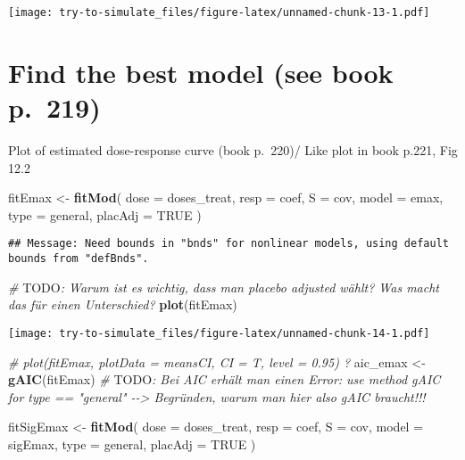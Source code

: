 \documentclass[
]{article}
\newenvironment{Shaded}{\begin{snugshade}}{\end{snugshade}}
\newcommand{\AlertTok}[1]{\textcolor[rgb]{0.94,0.16,0.16}{#1}}
\newcommand{\AttributeTok}[1]{\textcolor[rgb]{0.13,0.29,0.53}{#1}}
\newcommand{\CommentTok}[1]{\textcolor[rgb]{0.56,0.35,0.01}{\textit{#1}}}
\newcommand{\ConstantTok}[1]{\textcolor[rgb]{0.56,0.35,0.01}{#1}}
\newcommand{\FunctionTok}[1]{\textcolor[rgb]{0.13,0.29,0.53}{\textbf{#1}}}
\newcommand{\NormalTok}[1]{#1}
\newcommand{\OtherTok}[1]{\textcolor[rgb]{0.56,0.35,0.01}{#1}}
\newcommand{\StringTok}[1]{\textcolor[rgb]{0.31,0.60,0.02}{#1}}
\begin{document}
\texttt{[image: try-to-simulate\_files/figure-latex/unnamed-chunk-13-1.pdf]}

\hypertarget{find-the-best-model-see-book-p.-219}{%
\section{Find the best model (see book
p.~219)}\label{find-the-best-model-see-book-p.-219}}

Plot of estimated dose-response curve (book p.~220)/ Like plot in book
p.221, Fig 12.2

\begin{Shaded}
\begin{Highlighting}[]
\NormalTok{fitEmax }\OtherTok{\textless{}{-}} \FunctionTok{fitMod}\NormalTok{(}
  \AttributeTok{dose =}\NormalTok{ doses\_treat,}
  \AttributeTok{resp =}\NormalTok{ coef,}
  \AttributeTok{S =}\NormalTok{ cov,}
  \AttributeTok{model =} \StringTok{\textquotesingle{}emax\textquotesingle{}}\NormalTok{,}
  \AttributeTok{type =} \StringTok{\textquotesingle{}general\textquotesingle{}}\NormalTok{,}
  \AttributeTok{placAdj =} \ConstantTok{TRUE}
\NormalTok{)}
\end{Highlighting}
\end{Shaded}

\begin{verbatim}
## Message: Need bounds in "bnds" for nonlinear models, using default bounds from "defBnds".
\end{verbatim}

\begin{Shaded}
\begin{Highlighting}[]
\CommentTok{\# }\AlertTok{TODO}\CommentTok{: Warum ist es wichtig, dass man placebo adjusted wählt? Was macht das für einen Unterschied?}
\FunctionTok{plot}\NormalTok{(fitEmax)}
\end{Highlighting}
\end{Shaded}

\texttt{[image: try-to-simulate\_files/figure-latex/unnamed-chunk-14-1.pdf]}

\begin{Shaded}
\begin{Highlighting}[]
\CommentTok{\# plot(fitEmax, plotData = \textquotesingle{}meansCI\textquotesingle{}, CI = T, level = 0.95) ?}
\NormalTok{aic\_emax }\OtherTok{\textless{}{-}} \FunctionTok{gAIC}\NormalTok{(fitEmax)}
\CommentTok{\# }\AlertTok{TODO}\CommentTok{: Bei AIC erhält man einen Error: use method gAIC for type == "general" {-}{-}\textgreater{} Begründen, warum man hier also gAIC braucht!!!}

\NormalTok{fitSigEmax }\OtherTok{\textless{}{-}} \FunctionTok{fitMod}\NormalTok{(}
  \AttributeTok{dose =}\NormalTok{ doses\_treat,}
  \AttributeTok{resp =}\NormalTok{ coef,}
  \AttributeTok{S =}\NormalTok{ cov,}
  \AttributeTok{model =} \StringTok{\textquotesingle{}sigEmax\textquotesingle{}}\NormalTok{,}
  \AttributeTok{type =} \StringTok{\textquotesingle{}general\textquotesingle{}}\NormalTok{,}
  \AttributeTok{placAdj =} \ConstantTok{TRUE}
\NormalTok{)}
\end{Highlighting}
\end{Shaded}
\end{document}
